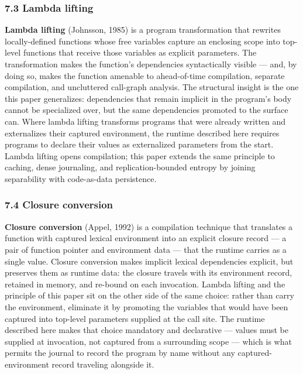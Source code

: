 \documentclass[
]{article}
\begin{document}
\subsubsection{7.3 Lambda lifting}\label{lambda-lifting}

\textbf{Lambda lifting} (Johnsson, 1985) is a program transformation
that rewrites locally-defined functions whose free variables capture an
enclosing scope into top-level functions that receive those variables as
explicit parameters. The transformation makes the function's
dependencies syntactically visible --- and, by doing so, makes the
function amenable to ahead-of-time compilation, separate compilation,
and uncluttered call-graph analysis. The structural insight is the one
this paper generalizes: dependencies that remain implicit in the
program's body cannot be specialized over, but the same dependencies
promoted to the surface can. Where lambda lifting transforms programs
that were already written and externalizes their captured environment,
the runtime described here requires programs to declare their values as
externalized parameters from the start. Lambda lifting opens
compilation; this paper extends the same principle to caching, dense
journaling, and replication-bounded entropy by joining separability with
code-as-data persistence.

\subsubsection{7.4 Closure conversion}\label{closure-conversion}

\textbf{Closure conversion} (Appel, 1992) is a compilation technique
that translates a function with captured lexical environment into an
explicit closure record --- a pair of function pointer and environment
data --- that the runtime carries as a single value. Closure conversion
makes implicit lexical dependencies explicit, but preserves them as
runtime data: the closure travels with its environment record, retained
in memory, and re-bound on each invocation. Lambda lifting and the
principle of this paper sit on the other side of the same choice: rather
than carry the environment, eliminate it by promoting the variables that
would have been captured into top-level parameters supplied at the call
site. The runtime described here makes that choice mandatory and
declarative --- values must be supplied at invocation, not captured from
a surrounding scope --- which is what permits the journal to record the
program by name without any captured-environment record traveling
alongside it.
\end{document}
